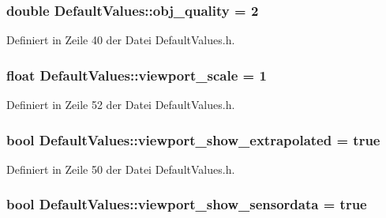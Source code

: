 \hypertarget{classDefaultValues_aa7a66c2f7ed71d8b70e17a249b178b77}{
\subsubsection[{obj\-\_\-quality}]{\setlength{\rightskip}{0pt plus 5cm}double Default\-Values\-::obj\-\_\-quality = 2}}\label{classDefaultValues_aa7a66c2f7ed71d8b70e17a249b178b77}


Definiert in Zeile 40 der Datei Default\-Values.\-h.

\hypertarget{classDefaultValues_a8b35f6b9a00500405819eb07f986ef97}{
\subsubsection[{viewport\-\_\-scale}]{\setlength{\rightskip}{0pt plus 5cm}float Default\-Values\-::viewport\-\_\-scale = 1}}\label{classDefaultValues_a8b35f6b9a00500405819eb07f986ef97}


Definiert in Zeile 52 der Datei Default\-Values.\-h.

\hypertarget{classDefaultValues_a6276bda75c6e96c1fb857502e5d21e85}{
\subsubsection[{viewport\-\_\-show\-\_\-extrapolated}]{\setlength{\rightskip}{0pt plus 5cm}bool Default\-Values\-::viewport\-\_\-show\-\_\-extrapolated = true}}\label{classDefaultValues_a6276bda75c6e96c1fb857502e5d21e85}


Definiert in Zeile 50 der Datei Default\-Values.\-h.

\hypertarget{classDefaultValues_a456bf1afc20078111b87b57576de068c}{
\subsubsection[{viewport\-\_\-show\-\_\-sensordata}]{\setlength{\rightskip}{0pt plus 5cm}bool Default\-Values\-::viewport\-\_\-show\-\_\-sensordata = true}}\label{classDefaultValues_a456bf1afc20078111b87b57576de068c}


